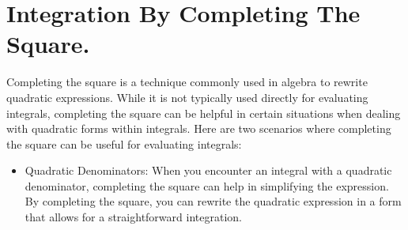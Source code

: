 \documentclass{report}
\begin{document}
      \pagebreak \bigbreak \noindent
      \section{Integration By Completing The Square.}
      \bigbreak \noindent 
      Completing the square is a technique commonly used in algebra to rewrite quadratic expressions. While it is not typically used directly for evaluating integrals, completing the square can be helpful in certain situations when dealing with quadratic forms within integrals. Here are two scenarios where completing the square can be useful for evaluating integrals:

      \begin{itemize}
          \item Quadratic Denominators: When you encounter an integral with a quadratic denominator, completing the square can help in simplifying the expression. By completing the square, you can rewrite the quadratic expression in a form that allows for a straightforward integration.
      \end{itemize}
\end{document}
